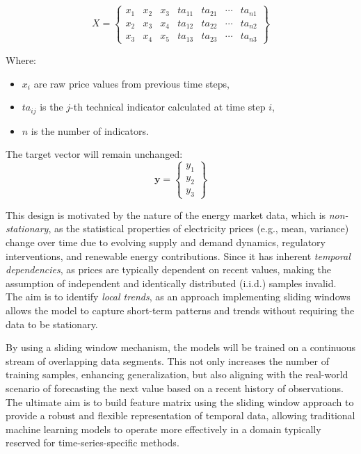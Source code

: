 \documentclass[12pt]{report} %
\begin{document}
\begin{equation*}
{X} = \begin{Bmatrix}
x_1 & x_2 & x_3 & ta_{11} & ta_{21} & \cdots & ta_{n1}\\
x_2 & x_3 & x_4 & ta_{12} & ta_{22} & \cdots & ta_{n2}\\
x_3 & x_4 & x_5 & ta_{13} & ta_{23} & \cdots & ta_{n3}
\end{Bmatrix}
\end{equation*}

Where:
\begin{itemize}
    \item $x_i$ are raw price values from previous time steps,
    \item $ta_{ij}$ is the $j$-th technical indicator calculated at time step $i$,
    \item $n$ is the number of indicators.
\end{itemize}

The target vector will remain unchanged:
\begin{equation*}
\mathbf{y} = \begin{Bmatrix}
y_1 \\
y_2 \\
y_3
\end{Bmatrix}
\end{equation*}

This design is motivated by the nature of the energy market data, which is \textit{non-stationary}, as the statistical properties of electricity prices (e.g., mean, variance) change over time due to evolving supply and demand dynamics, regulatory interventions, and renewable energy contributions. Since it has inherent \textit{temporal dependencies}, as prices are typically dependent on recent values, making the assumption of independent and identically distributed (i.i.d.) samples invalid. The aim is to identify \textit{local trends}, as an approach implementing sliding windows allows the model to capture short-term patterns and trends without requiring the data to be stationary.

By using a sliding window mechanism, the models will be trained on a continuous stream of overlapping data segments. This not only increases the number of training samples, enhancing generalization, but also aligning with the real-world scenario of forecasting the next value based on a recent history of observations. The ultimate aim is to build feature matrix using the sliding window approach to provide a robust and flexible representation of temporal data, allowing traditional machine learning models to operate more effectively in a domain typically reserved for time-series-specific methods.
\end{document}
